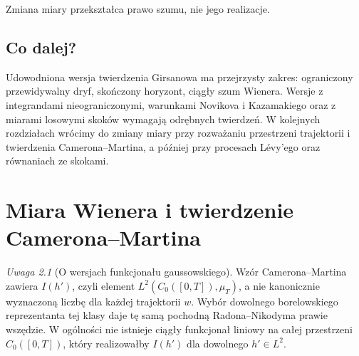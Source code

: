\documentclass[11pt,a4paper,oneside]{report}
\numberwithin{equation}{chapter}
\theoremstyle{plain}
\theoremstyle{definition}
\theoremstyle{remark}
\newtheorem{uwaga}{Uwaga}[chapter]
\newcommand{\Prob}{\mathbb{P}}
\newcommand{\dd}{\mathrm{d}}
\begin{document}
\begin{center}
\par\smallskip\small Zmiana miary przekształca prawo szumu, nie jego realizacje.
\end{center}

\section{Co dalej?}
Udowodniona wersja twierdzenia Girsanowa ma przejrzysty
zakres: ograniczony przewidywalny dryf, skończony horyzont,
ciągły szum Wienera. Wersje z integrandami nieograniczonymi,
warunkami Novikova i Kazamakiego oraz z miarami losowymi
skoków wymagają odrębnych twierdzeń.
W kolejnych rozdziałach wrócimy do zmiany miary przy
rozważaniu przestrzeni trajektorii i twierdzenia
Camerona--Martina, a później przy procesach Lévy'ego
oraz równaniach ze skokami.

\chapter{Miara Wienera i twierdzenie Camerona--Martina}
\label{ch:cameron-martin}

\begin{uwaga}[O wersjach funkcjonału gaussowskiego]
Wzór Camerona--Martina zawiera $I(h')$, czyli element
$L^2(C_0([0,T]),\mu_T)$, a nie kanonicznie wyznaczoną
liczbę dla każdej trajektorii $w$. Wybór dowolnego
borelowskiego reprezentanta tej klasy daje tę samą
pochodną Radona--Nikodyma prawie wszędzie. W ogólności
nie istnieje ciągły funkcjonał liniowy na całej
przestrzeni $C_0([0,T])$, który realizowałby $I(h')$
dla dowolnego $h'\in L^2$.
\end{uwaga}
\end{document}
